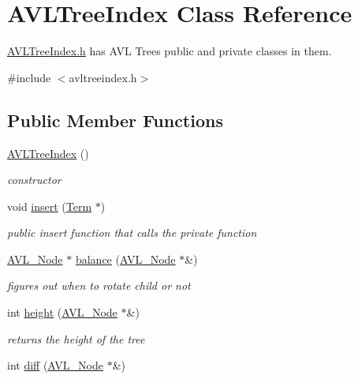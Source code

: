 \hypertarget{class_a_v_l_tree_index}{}\section{A\+V\+L\+Tree\+Index Class Reference}
\label{class_a_v_l_tree_index}


\hyperlink{avltreeindex_8h}{A\+V\+L\+Tree\+Index.\+h} has A\+V\+L Trees public and private classes in them.  




{\ttfamily \#include $<$avltreeindex.\+h$>$}

\subsection*{Public Member Functions}
\begin{DoxyCompactItemize}
\item 
\hyperlink{class_a_v_l_tree_index_aba8dc551ea4963a8082991f52bb19c25}{A\+V\+L\+Tree\+Index} ()
\begin{DoxyCompactList}\small\item\em constructor \end{DoxyCompactList}\item 
void \hyperlink{class_a_v_l_tree_index_a0954e6e43e3742008bf18e71a8afc319}{insert} (\hyperlink{class_term}{Term} $\ast$)
\begin{DoxyCompactList}\small\item\em public insert function that calls the private function \end{DoxyCompactList}\item 
\hyperlink{struct_a_v_l___node}{A\+V\+L\+\_\+\+Node} $\ast$ \hyperlink{class_a_v_l_tree_index_a580c720dab8aa7dd31ca4fc20718cd80}{balance} (\hyperlink{struct_a_v_l___node}{A\+V\+L\+\_\+\+Node} $\ast$\&)
\begin{DoxyCompactList}\small\item\em figures out when to rotate child or not \end{DoxyCompactList}\item 
int \hyperlink{class_a_v_l_tree_index_abb5a43355e33d3af6ab29b3a1fcfd93d}{height} (\hyperlink{struct_a_v_l___node}{A\+V\+L\+\_\+\+Node} $\ast$\&)
\begin{DoxyCompactList}\small\item\em returns the height of the tree \end{DoxyCompactList}\item 
int \hyperlink{class_a_v_l_tree_index_a95127bb897068de9eb3a589d0abfac53}{diff} (\hyperlink{struct_a_v_l___node}{A\+V\+L\+\_\+\+Node} $\ast$\&)

\end{DoxyCompactItemize}
